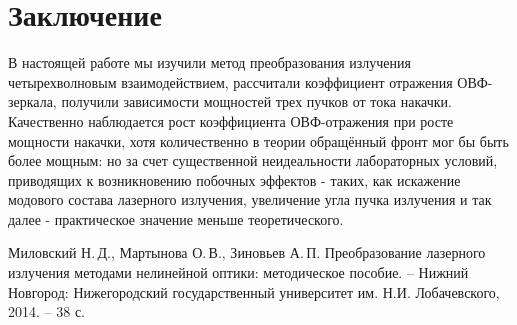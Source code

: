 \documentclass[a5paper,11pt]{extarticle}
\begin{document}
\newpage
{}
\section*{Заключение}
В настоящей работе мы изучили метод преобразования излучения четырехволновым взаимодействием, рассчитали коэффициент отражения ОВФ-зеркала, получили зависимости мощностей трех пучков от тока накачки. Качественно наблюдается рост коэффициента ОВФ-отражения при росте мощности накачки, хотя количественно в теории обращённый фронт мог бы быть более мощным: но за счет существенной неидеальности лабораторных условий, приводящих к возникновению побочных эффектов - таких, как искажение модового состава лазерного излучения, увеличение угла пучка излучения и так далее - практическое значение меньше теоретического. 

\begin{thebibliography}{}
   Миловский Н.\,Д., Мартынова О.\,В., Зиновьев А.\,П. Преобразование лазерного излучения методами нелинейной оптики: методическое пособие. -- Нижний Новгород: Нижегородский государственный университет им. Н.И. Лобачевского, 2014. -- 38 с.
    
\end{thebibliography}
\end{document}
